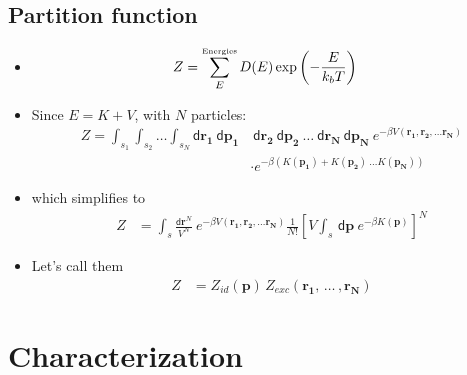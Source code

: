 \documentclass{beamer}
\newcommand*{\diff}{\mathsf{d}}
\begin{document}
\subsection*{Partition function}
\begin{frame}
	\begin{itemize}
		\item 
			\begin{align*} Z &= \sum_E^{\text{\tiny Energies}} D(E) 	
			\exp\left(-\frac{E}{k_b T}\right)
			\end{align*}

		\item Since $E = K + V$, with $N$ particles: 
			\begin{align*}
    		Z = \int_{s_1} \int_{s_2} \dots \int_{s_N}  \diff\mathbf{r_1}~ \diff\mathbf{p_1}  &~\diff\mathbf{r_2} ~\diff\mathbf{p_2} ~\dots ~\diff\mathbf{r_N}~ \diff\mathbf{p_N} ~e^{-\beta V(\mathbf{r_1}, \mathbf{r_2}, \dots \mathbf{r_N})}\\
    		&\cdot e^{-\beta(K(\mathbf{p_1}) + K(\mathbf{p_2}) ~\dots K(\mathbf{p_N}))}
			\end{align*}
		\item which simplifies to 
			\begin{align*}
			Z &= \int_s \frac{\diff\mathbf{r}^N}{V^N} ~e^{-\beta V(\mathbf{r_1}, \mathbf{r_2}, \dots \mathbf{r_N})} \frac{1}{ N!}	\left[V\int_s \,\diff\mathbf{p}~e^{-\beta K(\mathbf{p})}\right]^{N} 
			\end{align*}
		\item Let's call them 
			\begin{align*}
				Z &= Z_{id}(\mathbf{p})\,Z_{exc}(\mathbf{r_1},\, \dots\, ,\mathbf{r_N})	
			\end{align*}
	\end{itemize}
\end{frame}

\section*{Characterization}
\end{document}
